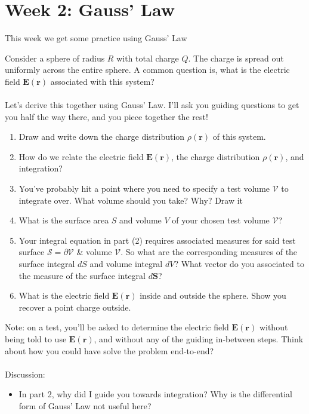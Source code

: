 \documentclass[12pt,fleqn]{article}
\numberwithin{equation}{section} %
\newcounter{problem}
\begin{document}
\newpage
\section{Week 2: Gauss' Law}
This week we get some practice using Gauss' Law
\begin{problem}
	Consider a sphere of radius $R$ with total charge $Q$. The charge is spread out uniformly across the entire sphere. A common question is, what is the electric field $\mathbf E(\mathbf r)$ associated with this system? \\
	\\
	Let's derive this together using Gauss' Law. I'll ask you guiding questions to get you half the way there, and you piece together the rest!
	\begin{enumerate}
		\item Draw and write down the charge distribution $\rho(\mathbf r)$ of this system.
		\item How do we relate the electric field $\mathbf E(\mathbf r)$, the charge distribution $\rho(\mathbf r)$, and integration? 
		\item You've probably hit a point where you need to specify a test volume $\mathcal V$ to integrate over. What volume should you take? Why? Draw it 
		\item What is the surface area $S$ and volume $V$ of your chosen test volume $\mathcal V$?  
		\item Your integral equation in part (2) requires associated measures for said test surface $\mathcal S = \partial \mathcal V$ \& volume $\mathcal V$. So what are the corresponding measures of the surface integral $d S$ and volume integral $dV$? What vector do you associated to the measure of the surface integral $d \mathbf S$?
		\item What is the electric field $\mathbf E(\mathbf r)$ inside and outside the sphere. Show you recover a point charge outside.
	\end{enumerate}
	Note: on a test, you'll be asked to determine the electric field $\mathbf E(\mathbf r)$ without being told to use $\mathbf E(\mathbf r)$, and without any of the guiding in-between steps. Think about how you could have solve the problem end-to-end?
	\\
	\\
	Discussion:
	\begin{itemize}
		\item In part 2, why did I guide you towards integration? Why is the differential form of Gauss' Law not useful here?

\end{itemize}
\end{problem}
\end{document}
